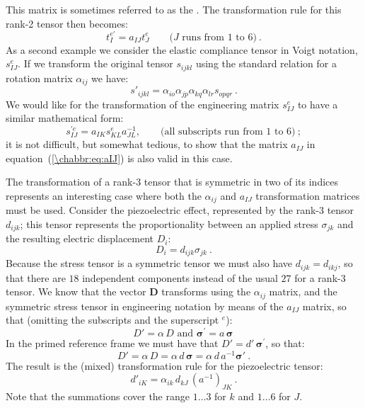 This matrix is sometimes referred to as the .  The transformation rule for this rank-2 tensor then becomes:
\[
	t^{e\prime}_I = a_{IJ}t^e_J\qquad\text{($J$ runs from $1$ to $6$)}\ .
\]
As a second example we consider the elastic compliance tensor in Voigt notation, $s^e_{IJ}$.  If we transform the original tensor $s_{ijkl}$ using the standard relation for a rotation matrix $\alpha_{ij}$ we have:
\[
	s'_{ijkl} = \alpha_{io}\alpha_{jp}\alpha_{kq}\alpha_{lr} s_{opqr}\ .
\]
We would like for the transformation of the engineering matrix $s^e_{IJ}$ to have a similar mathematical form:
\[
	s^{\prime e}_{IJ} = a_{IK}s^e_{KL}a^{-1}_{JL} ,\qquad\text{(all subscripts run from $1$ to $6$)}\ ;
\]
it is not difficult, but somewhat tedious, to show that the matrix $a_{IJ}$ in equation~(\ref{\chabbr:eq:aIJ}) is also valid in this case.

The transformation of a rank-3 tensor that is symmetric in two of its indices represents an interesting case where both the $\alpha_{ij}$ and $a_{IJ}$ transformation matrices must be used.  Consider the piezoelectric effect, represented by the rank-3 tensor $d_{ijk}$; this tensor represents the proportionality between an applied stress $\sigma_{jk}$ and the resulting electric displacement $D_i$:
\[
	D_i = d_{ijk}\sigma_{jk}\ .
\]
Because the stress tensor is a symmetric tensor we must also have $d_{ijk}=d_{ikj}$, so that there are $18$ independent components instead of the usual $27$ for a rank-3 tensor.  We know that the vector $\mathbf{D}$ transforms using the $\alpha_{ij}$ matrix, and the symmetric stress tensor in engineering notation by means of the $a_{IJ}$ matrix, so that (omitting the subscripts and the superscript $^e$):
\[
	D' = \alpha\, D\text{ and } \bm{\sigma}^{\prime} = a\,\bm{\sigma}\, 
\]
In the primed reference frame we must have that $D' = d'\,\bm{\sigma}^{\prime}$, so that:
\[
	D' = \alpha\,D = \alpha\, d\,\bm{\sigma} = \alpha\, d\, a^{-1}\bm{\sigma}'\ .
\]
The result is the (mixed) transformation rule for the piezoelectric tensor:
\[
	d'_{iK} = \alpha_{ik}\,d_{kJ}\,(a^{-1})_{JK}\ .
\]
Note that the summations cover the range $1\ldots 3$ for $k$ and $1\ldots 6$ for $J$.


